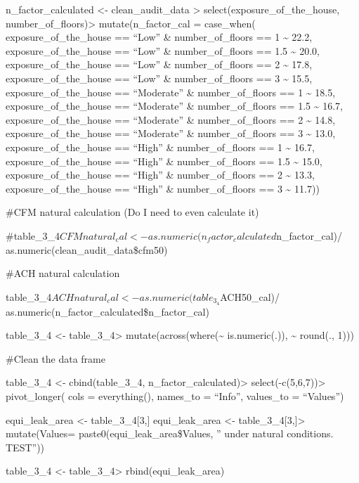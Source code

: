 \documentclass[
  letterpaper,
  DIV=11,
  numbers=noendperiod]{scrartcl}
\begin{document}
n\_factor\_calculated \textless- clean\_audit\_data
\textbar\textgreater{} select(exposure\_of\_the\_house,
number\_of\_floors)\textbar\textgreater{} mutate(n\_factor\_cal =
case\_when( exposure\_of\_the\_house == ``Low'' \& number\_of\_floors ==
1 \textasciitilde{} 22.2, exposure\_of\_the\_house == ``Low'' \&
number\_of\_floors == 1.5 \textasciitilde{} 20.0,
exposure\_of\_the\_house == ``Low'' \& number\_of\_floors == 2
\textasciitilde{} 17.8, exposure\_of\_the\_house == ``Low'' \&
number\_of\_floors == 3 \textasciitilde{} 15.5, exposure\_of\_the\_house
== ``Moderate'' \& number\_of\_floors == 1 \textasciitilde{} 18.5,
exposure\_of\_the\_house == ``Moderate'' \& number\_of\_floors == 1.5
\textasciitilde{} 16.7, exposure\_of\_the\_house == ``Moderate'' \&
number\_of\_floors == 2 \textasciitilde{} 14.8, exposure\_of\_the\_house
== ``Moderate'' \& number\_of\_floors == 3 \textasciitilde{} 13.0,
exposure\_of\_the\_house == ``High'' \& number\_of\_floors == 1
\textasciitilde{} 16.7, exposure\_of\_the\_house == ``High'' \&
number\_of\_floors == 1.5 \textasciitilde{} 15.0,
exposure\_of\_the\_house == ``High'' \& number\_of\_floors == 2
\textasciitilde{} 13.3, exposure\_of\_the\_house == ``High'' \&
number\_of\_floors == 3 \textasciitilde{} 11.7))

\#CFM natural calculation (Do I need to even calculate it)

\#table\_3\_4\(CFMnatural_cal <- as.numeric(n_factor_calculated\)n\_factor\_cal)/
as.numeric(clean\_audit\_data\$cfm50)

\#ACH natural calculation

table\_3\_4\(ACHnatural_cal <- as.numeric(table_3_4\)ACH50\_cal)/
as.numeric(n\_factor\_calculated\$n\_factor\_cal)

table\_3\_4 \textless- table\_3\_4\textbar\textgreater{}
mutate(across(where(\textasciitilde{} is.numeric(.)), \textasciitilde{}
round(., 1)))

\#Clean the data frame

table\_3\_4 \textless- cbind(table\_3\_4,
n\_factor\_calculated)\textbar\textgreater{}
select(-c(5,6,7))\textbar\textgreater{} pivot\_longer( cols =
everything(), names\_to = ``Info'', values\_to = ``Values'')

equi\_leak\_area \textless- table\_3\_4{[}3,{]} equi\_leak\_area
\textless- table\_3\_4{[}3,{]}\textbar\textgreater{} mutate(Values=
paste0(equi\_leak\_area\$Values, '' under natural conditions. TEST''))

table\_3\_4 \textless- table\_3\_4\textbar\textgreater{}
rbind(equi\_leak\_area)
\end{document}
